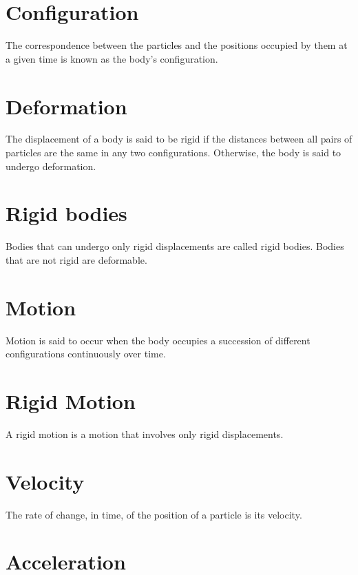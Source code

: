 \documentclass[
  letterpaper,
  DIV=11,
  numbers=noendperiod]{scrreprt}
\begin{document}
\section{Configuration}\label{configuration}

The correspondence between the particles and the positions occupied by
them at a given time is known as the body's configuration.

\section{Deformation}\label{deformation}

The displacement of a body is said to be rigid if the distances between
all pairs of particles are the same in any two configurations.
Otherwise, the body is said to undergo deformation.

\section{Rigid bodies}\label{rigid-bodies}

Bodies that can undergo only rigid displacements are called rigid
bodies. Bodies that are not rigid are deformable.

\section{Motion}\label{motion}

Motion is said to occur when the body occupies a succession of different
configurations continuously over time.

\section{Rigid Motion}\label{rigid-motion}

A rigid motion is a motion that involves only rigid displacements.

\section{Velocity}\label{velocity}

The rate of change, in time, of the position of a particle is its
velocity.

\section{Acceleration}\label{acceleration}
\end{document}
